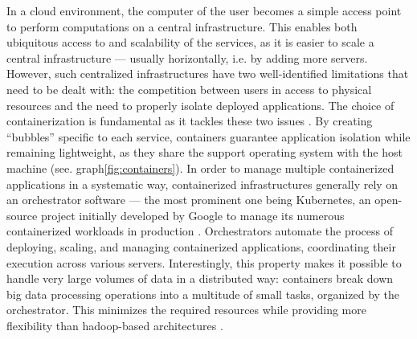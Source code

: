 In a cloud environment, the computer of the user becomes a simple access point to perform computations on a central infrastructure. This enables both ubiquitous access to and scalability of the services, as it is easier to scale a central infrastructure — usually horizontally, i.e. by adding more servers. However, such centralized infrastructures have two well-identified limitations that need to be dealt with: the competition between users in access to physical resources and the need to properly isolate deployed applications. The choice of containerization is fundamental as it tackles these two issues \cite{bentaleb2022containerization}. By creating “bubbles” specific to each service, containers guarantee application isolation while remaining lightweight, as they share the support operating system with the host machine (see. graph\ref{fig:containers}). In order to manage multiple containerized applications in a systematic way, containerized infrastructures generally rely on an orchestrator software — the most prominent one being Kubernetes, an open-source project initially developed by Google to manage its numerous containerized workloads in production \cite{vano2023cloud}. Orchestrators automate the process of deploying, scaling, and managing containerized applications, coordinating their execution across various servers. Interestingly, this property makes it possible to handle very large volumes of data in a distributed way: containers break down big data processing operations into a multitude of small tasks, organized by the orchestrator. This minimizes the required resources while providing more flexibility than hadoop-based architectures \cite{zhang2018comparative}.

